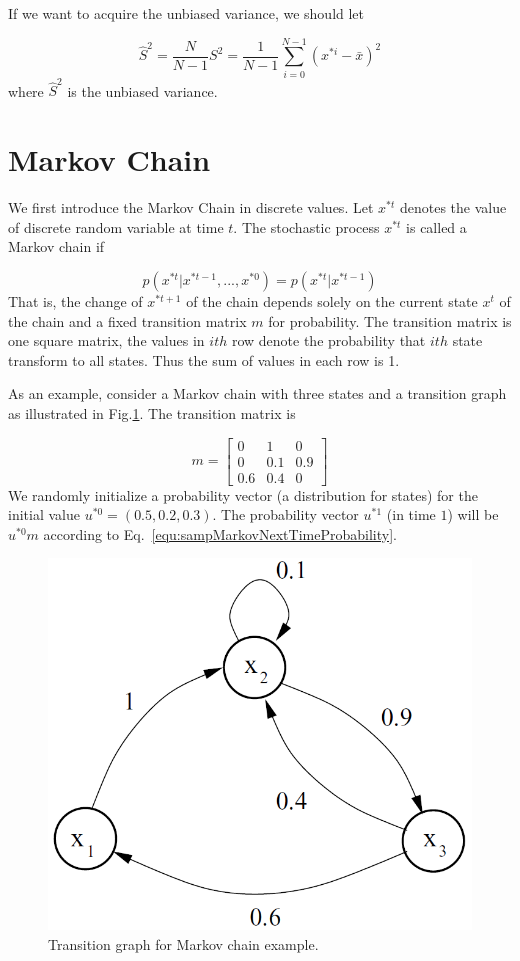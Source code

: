 \documentclass[runningheads,openany]{xhlPaper}
\begin{document}
If we want to acquire the unbiased variance, we should let

\begin{displaymath}
\hat{S}^2=\frac{N}{N-1}S^2 = \frac{1}{N-1}\sum_{i=0}^{N-1}{\left ( x^{*i}- \bar{x} \right )^2}
\end{displaymath}
where $\hat{S}^2$ is the unbiased variance.

\section{Markov Chain}
\label{sec:sampMarkovChain}
We first introduce the Markov Chain in discrete values. Let $x^{*t}$ denotes the value of discrete random variable at time $t$. The stochastic process $x^{*t}$ is called a Markov chain if 

\begin{displaymath}
p\left( {{x^{*t}}|{x^{*t - 1}},...,{x^{*0}}} \right) = p\left( {{x^{*t}}|{x^{*t - 1}}} \right)
\end{displaymath}
That is, the change of $x^{*t + 1}$ of the chain depends solely on the current state $x^{t}$ of the chain and a fixed transition matrix $m$ for probability.
The transition matrix is one square matrix, the values in $ith$ row denote the probability that $ith$ state transform to all states. Thus the sum of values in each row is 1.

As an example, consider a Markov chain with three states and a transition graph as illustrated in Fig.\ref{fig:sampMarkovTransitionGraph}. The transition matrix is

\begin{displaymath}
m = \left[ {\begin{array}{*{20}{c}}
0&1&0\\
0&{0.1}&{0.9}\\
{0.6}&{0.4}&0
\end{array}} \right]
\end{displaymath}
We randomly initialize a probability vector (a distribution for states) for the initial value $u^{*0} = \left(0.5, 0.2, 0.3\right)$. The probability vector $u^{*1}$ (in time $1$) will be $u^{*0}m$ according to Eq.~\ref{equ:sampMarkovNextTimeProbability}.

\begin{figure}
\centering
\includegraphics[width=0.5\linewidth]{sampMarkovTransitionGraph}
\caption{Transition graph for Markov chain example. }
\label{fig:sampMarkovTransitionGraph}
\end{figure}
\end{document}
